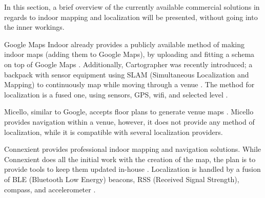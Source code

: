 
In this section, a brief overview of the currently available commercial solutions in regards to indoor mapping and localization will be presented, without going into the inner workings.

Google Maps Indoor already provides a publicly available method of making indoor maps (adding them to Google Maps), by uploading and fitting a schema on top of Google Maps \cite{google_maps_indoor}.
Additionally, Cartographer was recently introduced; a backpack with sensor equipment using SLAM (Simultaneous Localization and Mapping) to continuously map while moving through a venue \cite{cartographer}.
The method for localization is a fused one, using sensors, GPS, wifi, and selected level \cite[Slide 45]{indoor_maps_google_slides}.

Micello, similar to Google, accepts floor plans to generate venue maps \cite{micello}.
Micello provides navigation within a venue, however, it does not provide any method of localization, while it is compatible with several localization providers.

Connexient provides professional indoor mapping and navigation solutions.
While Connexient does all the initial work with the creation of the map, the plan is to provide tools to keep them updated in-house \cite{connexient_indoor_map}.
Localization is handled by a fusion of BLE (Bluetooth Low Energy) beacons, RSS (Received Signal Strength), compass, and accelerometer \cite{connexient_indoor_pos}.
